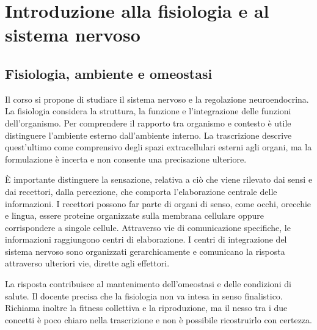 
\chapter{Introduzione alla fisiologia e al sistema nervoso}

\section{Fisiologia, ambiente e omeostasi}

Il corso si propone di studiare il sistema nervoso e la regolazione neuroendocrina. La fisiologia considera la struttura, la funzione e l'integrazione delle funzioni dell'organismo. Per comprendere il rapporto tra organismo e contesto è utile distinguere l'ambiente esterno dall'ambiente interno. La trascrizione descrive quest'ultimo come comprensivo degli spazi extracellulari esterni agli organi, ma la formulazione è incerta e non consente una precisazione ulteriore.

È importante distinguere la sensazione, relativa a ciò che viene rilevato dai sensi e dai recettori, dalla percezione, che comporta l'elaborazione centrale delle informazioni. I recettori possono far parte di organi di senso, come occhi, orecchie e lingua, essere proteine organizzate sulla membrana cellulare oppure corrispondere a singole cellule. Attraverso vie di comunicazione specifiche, le informazioni raggiungono centri di elaborazione. I centri di integrazione del sistema nervoso sono organizzati gerarchicamente e comunicano la risposta attraverso ulteriori vie, dirette agli effettori.

La risposta contribuisce al mantenimento dell'omeostasi e delle condizioni di salute. Il docente precisa che la fisiologia non va intesa in senso finalistico. Richiama inoltre la fitness collettiva e la riproduzione, ma il nesso tra i due concetti è poco chiaro nella trascrizione e non è possibile ricostruirlo con certezza.

